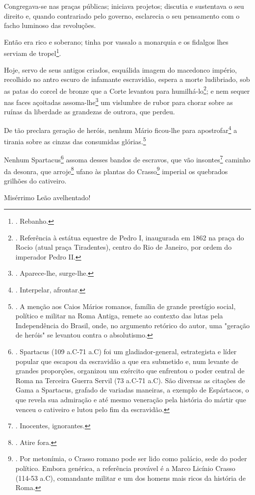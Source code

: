 Congregava-se nas praças públicas; iniciava projetos; discutia e
sustentava o seu direito e, quando contrariado pelo governo, esclarecia
o seu pensamento com o facho luminoso das revoluções.

Então era rico e soberano; tinha por vassalo a monarquia e os fidalgos
lhes serviam de tropel\footnote{. Rebanho.}.

Hoje, servo de seus antigos criados, esquálida imagem do macedonco
império, recolhido no antro escuro de infamante escravidão, espera a
morte ludibriado, sob as patas do corcel de bronze que a Corte levantou
para humilhá-lo\footnote{. Referência à estátua equestre de Pedro I,
  inaugurada em 1862 na praça do Rocio (atual praça Tiradentes), centro
  do Rio de Janeiro, por ordem do imperador Pedro II.}; e nem sequer nas
faces açoitadas assoma-lhe\footnote{. Aparece-lhe, surge-lhe.} um
vislumbre de rubor para chorar sobre as ruínas da liberdade as grandezas
de outrora, que perdeu.

De tão preclara geração de heróis, nenhum Mário ficou-lhe para
apostrofar\footnote{. Interpelar, afrontar.} a tirania sobre as cinzas
das consumidas glórias.\footnote{. A menção aos Caios Mários romanos,
  família de grande prestígio social, político e militar na Roma Antiga,
  remete ao contexto das lutas pela Independência do Brasil, onde, no
  argumento retórico do autor, uma "geração de heróis" se levantou
  contra o absolutismo.}

Nenhum Spartacus\footnote{. Spartacus (109 a.C-71 a.C) foi um
  gladiador-general, estrategista e líder popular que escapou da
  escravidão a que era submetido e, num levante de grandes proporções,
  organizou um exército que enfrentou o poder central de Roma na
  Terceira Guerra Servil (73 a.C-71 a.C). São diversas as citações de
  Gama a Spartacus, grafado de variadas maneiras, a exemplo de
  Espártacos, o que revela sua admiração e até mesmo veneração pela
  história do mártir que venceu o cativeiro e lutou pelo fim da
  escravidão.} assoma desses bandos de escravos, que vão
insontes\footnote{. Inocentes, ignorantes.} caminho da desonra, que
arroje\footnote{. Atire fora.} ufano às plantas do Crasso\footnote{. Por
  metonímia, o Crasso romano pode ser lido como palácio, sede do poder
  político. Embora genérica, a referência provável é a Marco Licínio
  Crasso (114-53 a.C), comandante militar e um dos homens mais ricos da
  história de Roma.} imperial os quebrados grilhões do cativeiro.

Misérrimo Leão avelhentado!

